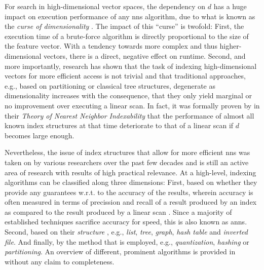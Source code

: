 For search in high-dimensional vector spaces, the dependency on $d$ has a huge impact on execution performance of any \acrshort{nns} algorithm, due to what is known as the \emph{curse of dimensionality} \cite{Indyk1998:Approximate,Zezula:2006Similarity}. The impact of this ``curse'' is twofold: First, the execution time of a brute-force algorithm is directly proportional to the size of the feature vector. With a tendency towards more complex and thus higher-dimensional vectors, there is a direct, negative effect on runtime. Second, and more importantly, research has shown that the task of indexing high-dimensional vectors for more efficient access is not trivial and that traditional approaches, e.g., based on partitioning or classical tree structures, degenerate as dimensionality increases \cite{Indyk1998:Approximate,Weber:1998Va} with the consequence, that they only yield marginal or no improvement over executing a linear scan. In fact, it was formally proven by \cite{Shaft:2006Theory} in their \emph{Theory of Nearest Neighbor Indexability} that the performance of almost all known index structures at that time deteriorate to that of a linear scan if $d$ becomes large enough.

Nevertheless, the issue of index structures that allow for more efficient \acrshort{nns} was taken on by various researchers over the past few decades and is still an active area of research with results of high practical relevance. At a high-level, indexing algorithms can be classified along three dimensions: First, based on whether they provide any guarantees w.r.t. to the accuracy of the results, wherein accuracy is often measured in terms of precission and recall of a result produced by an index as compared to the result produced by a linear scan \cite{Echihabi:2021High}. Since a majority of established techniques sacrifice accuracy for speed, this is also known as \acrfull{anns}. Second, based on their \emph{structure} \cite{Shaft:2006Theory}, e.g., \emph{list}, \emph{tree}, \emph{graph}, \emph{hash table} and \emph{inverted file}. And finally, by the method that is employed, e.g., \emph{quantization}, \emph{hashing} or \emph{partitioning}. An overview of different, prominent algorithms is provided in  without any claim to completeness.

